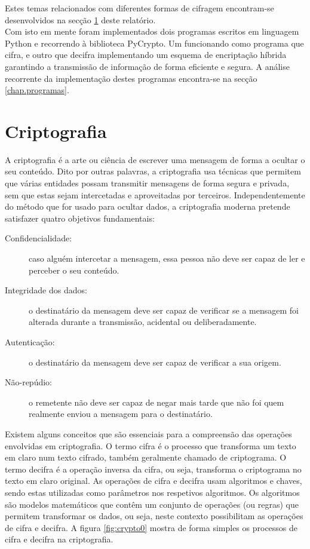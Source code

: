 \documentclass[a4paper,11pt,openright,oneside]{report}
\begin{document}
Estes temas relacionados com diferentes formas de cifragem encontram-se desenvolvidos na secção \ref{chap.criptografia} deste relatório.\\

Com isto em mente foram implementados dois programas escritos em linguagem Python e recorrendo à biblioteca PyCrypto. Um funcionando como programa que cifra, e outro que decifra implementando um esquema de encriptação híbrida garantindo a transmissão de informação de forma eficiente e segura. A análise recorrente da implementação destes programas encontra-se na secção \ref{chap.programas}.

\chapter{Criptografia}
\label{chap.criptografia}

A criptografia é a arte ou ciência de escrever uma mensagem de forma a ocultar o seu conteúdo. Dito por outras palavras, a criptografia usa técnicas que permitem que várias entidades possam transmitir mensagens de forma segura e privada, sem que estas sejam intercetadas e aproveitadas por terceiros. Independentemente do método que for usado para ocultar dados, a criptografia moderna pretende satisfazer quatro objetivos fundamentais:

\begin{description}
\item[Confidencialidade:] caso alguém intercetar a mensagem, essa pessoa não deve ser capaz de ler e perceber o seu conteúdo.
\item[Integridade dos dados:] o destinatário da mensagem deve ser capaz de verificar se a mensagem foi alterada durante a transmissão, acidental ou deliberadamente.
\item[Autenticação:] o destinatário da mensagem deve ser capaz de verificar a sua origem.
\item[Não-repúdio:] o remetente não deve ser capaz de negar mais tarde que não foi quem realmente enviou a mensagem para o destinatário.
\end{description}

Existem alguns conceitos que são essenciais para a compreensão das operações envolvidas em criptografia. O termo cifra é o processo que transforma um texto em claro num texto cifrado, também geralmente chamado de criptograma. O termo decifra é a operação inversa da cifra, ou seja, transforma o criptograma no texto em claro original. As operações de cifra e decifra usam algoritmos e chaves, sendo estas utilizadas como parâmetros nos respetivos algoritmos. Os algoritmos são modelos matemáticos que contêm um conjunto de operações (ou regras) que permitem transformar os dados, ou seja, neste contexto possibilitam as operações de cifra e decifra. A figura \ref{fig:crypto0} mostra de forma simples os processos de cifra e decifra na criptografia.
\end{document}
